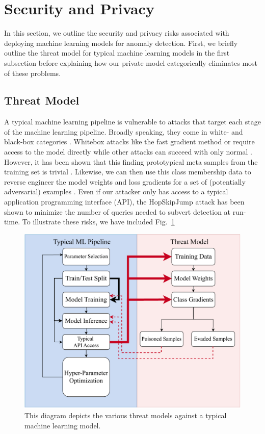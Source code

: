 \documentclass[sigconf]{acmart}
\begin{document}
\section{Security and Privacy}
\label{security}
In this section, we outline the security and privacy risks associated with deploying machine learning models for anomaly detection. First, we briefly outline the threat model for typical machine learning models in the first subsection before explaining how our private model categorically eliminates most of these problems. 

\subsection{Threat Model}
A typical machine learning pipeline is vulnerable to attacks that target each stage of the machine learning pipeline. Broadly speaking, they come in white- and black-box categories \cite{meyers}. Whitebox attacks like the fast gradient method \cite{fgm} or \cite{deepfool} require access to the model directly while other attacks can succeed with only normal . However, it has been shown that this finding prototypical meta samples from the training set is trivial \cite{}. Likewise, we can then use this class membership data to reverse engineer the model weights \cite{} and loss gradients for a set of (potentially adversarial) examples \cite{}. Even if our attacker only has access to a typical application programming interface (API), the HopSkipJump attack \cite{hopskipjump} has been shown to minimize the number of queries needed to subvert detection at run-time. To illustrate these risks, we have included Fig.~\ref{fig:threat_model}
\begin{figure}[h!]
    \centering
    \includegraphics[width=.8\textwidth]{images/attack_diagram.pdf}
    \caption{This diagram depicts the various threat models against a typical machine learning model.}
    \label{fig:threat_model}
\end{figure}
\label{threat}
\end{document}
